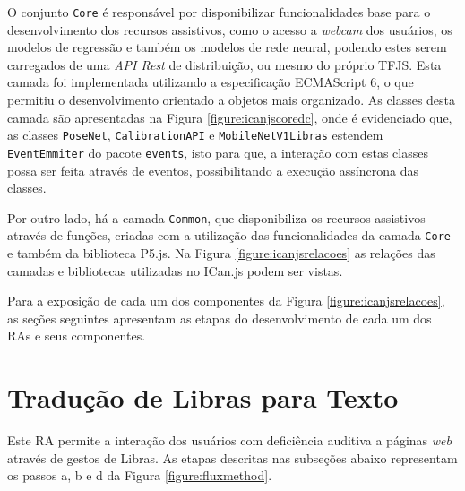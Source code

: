 
\par O conjunto \texttt{Core} é responsável por disponibilizar funcionalidades base para o desenvolvimento dos recursos assistivos, como o acesso a \textit{webcam} dos usuários, os modelos de regressão e também os modelos de rede neural, podendo estes serem carregados de uma \textit{API Rest} de distribuição, ou mesmo do próprio TFJS. Esta camada foi implementada utilizando a especificação ECMAScript 6, o que permitiu o desenvolvimento orientado a objetos mais organizado. As classes desta camada são apresentadas na Figura \ref{figure:icanjscoredc}, onde é evidenciado que, as classes \texttt{PoseNet}, \texttt{CalibrationAPI} e \texttt{MobileNetV1Libras} estendem \texttt{EventEmmiter} do pacote \texttt{events}, isto para que, a interação com estas classes possa ser feita através de eventos, possibilitando a execução assíncrona das classes.


\par Por outro lado, há a camada \texttt{Common}, que disponibiliza os recursos assistivos através de funções, criadas com a utilização das funcionalidades da camada \texttt{Core} e também da biblioteca P5.js. Na Figura \ref{figure:icanjsrelacoes} as relações das camadas e bibliotecas utilizadas no ICan.js podem ser vistas.


\par Para a exposição de cada um dos componentes da Figura \ref{figure:icanjsrelacoes}, as seções seguintes apresentam as etapas do desenvolvimento de cada um dos RAs e seus componentes.

\section{Tradução de Libras para Texto}

\par Este RA permite a interação dos usuários com deficiência auditiva a páginas \textit{web} através de gestos de Libras. As etapas descritas nas subseções abaixo representam os passos a, b e d da Figura \ref{figure:fluxmethod}.

